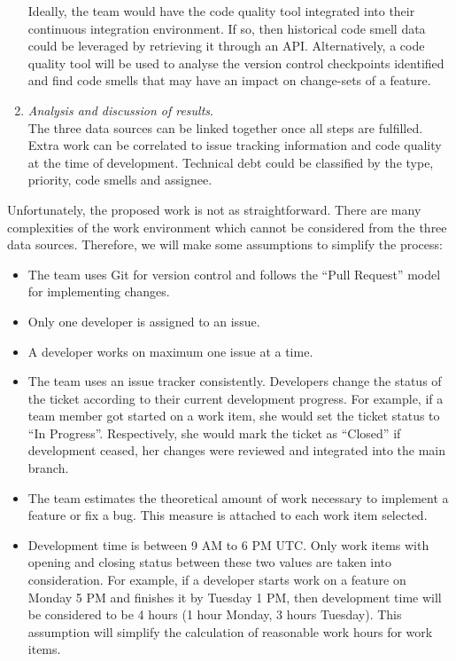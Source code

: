 \begin{enumerate}
	      Ideally, the team would have the code quality tool integrated into
	      their continuous integration environment. If so, then historical
	      code smell data could be leveraged by retrieving it through an API.
	      Alternatively, a code quality tool will be used to analyse the
	      version control checkpoints identified and find code smells that may
	      have an impact on change-sets of a feature.

	\item \textit{Analysis and discussion of results}.\\
	      The three data sources can be linked together once all steps are
	      fulfilled. Extra work can be correlated to issue tracking information
	      and code quality at the time of development. Technical debt could be
	      classified by the type, priority, code smells and assignee.
\end{enumerate}

Unfortunately, the proposed work is not as straightforward. There are many
complexities of the work environment which cannot be considered from the three
data sources. Therefore, we will make some assumptions to simplify the process:
\begin{itemize}
	\item The team uses Git for version control and follows the ``Pull
	      Request'' model for implementing changes.
	\item Only one developer is assigned to an issue.
	\item A developer works on maximum one issue at a time.
	\item The team uses an issue tracker consistently. Developers change the
	      status of the ticket according to their current development progress.
	      For example, if a team member got started on a work item, she would
	      set the ticket status to ``In Progress''. Respectively, she would mark
	      the ticket as ``Closed'' if development ceased, her changes were
	      reviewed and integrated into the main branch.
	\item The team estimates the theoretical amount of work necessary to
	      implement a feature or fix a bug. This measure is attached to each
	      work item selected.
	\item Development time is between 9 AM to 6 PM UTC. Only work items with
	      opening and closing status between these two values are taken into
	      consideration. For example, if a developer starts work on a feature on
	      Monday 5 PM and finishes it by Tuesday 1 PM, then development time
	      will be considered to be 4 hours (1 hour Monday, 3 hours Tuesday).
	      This assumption will simplify the calculation of reasonable work hours
	      for work items.
\end{itemize}

